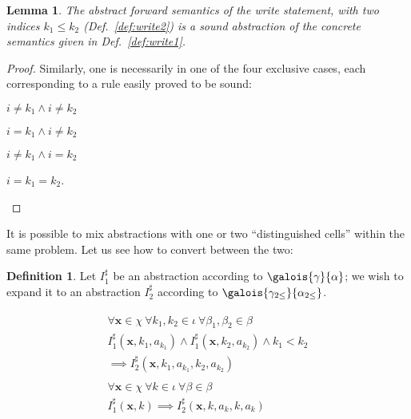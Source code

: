 \documentclass[a4paper]{article}
\newcommand{\ve}[1]{\mathbf{#1}}
\newcommand{\vx}{\ve{x}}
\newcommand{\abstr}[1]{#1^\sharp}
\theoremstyle{definition}
\newtheorem{definition}{Definition}
\theoremstyle{plain}
\newtheorem{lemma}[theorem]{Lemma}
\newcommand{\rulespacing}{\\[0.4em]}
\begin{document}
\begin{lemma}
The abstract forward semantics of the write statement, with two indices $k_1 \leq k_2$ (Def.~\ref{def:write2}) is a sound abstraction of the concrete semantics given in Def.~\ref{def:write1}.
\end{lemma}

\begin{proof}
Similarly, one is necessarily in one of the four exclusive cases, each corresponding to a rule easily proved to be sound:
\begin{inparaenum}[i)]
\item $i \neq k_1 \land i \neq k_2$
\item $i = k_1 \land i \neq k_2$
\item $i \neq k_1 \land i = k_2$
\item $i = k_1 = k_2$.
\end{inparaenum}
\end{proof}

It is possible to mix abstractions with one or two ``distinguished cells'' within the same problem. Let us see how to convert between the two:

\begin{definition}\label{def:expansion1to2}
Let $\abstr{I}_1$ be an abstraction according to $\galois{\gamma}{\alpha}$; we wish to expand it to an abstraction $\abstr{I}_2$ according to $\galois{\gamma_{2\leq}}{\alpha_{2\leq}}$.

\begin{align}
\begin{aligned}
\forall \vx \in \chi~ \forall k_1, k_2\in\iota~ \forall \beta_1,\beta_2 \in \beta\\
  \abstr{I}_1(\vx, k_1, a_{k_1}) \land \abstr{I}_1(\vx, k_2, a_{k_2}) 
  \land k_1 < k_2
  \\ \implies
  \abstr{I}_2(\vx, k_1,  a_{k_1}, k_2, a_{k_2})
\end{aligned}\rulespacing
\begin{aligned}
\forall \vx \in \chi~ \forall k \in\iota~ \forall \beta \in \beta\\
  \abstr{I}_1(\vx, k) \implies
  \abstr{I}_2(\vx, k,  a_k, k, a_k)
\end{aligned}
\end{align}
\end{definition}
\end{document}
